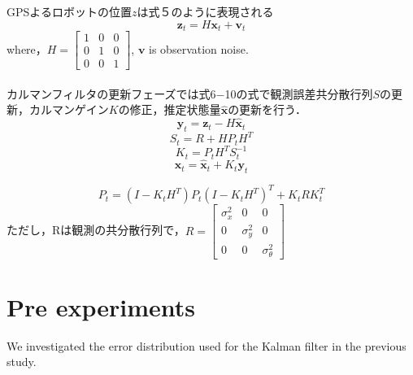 \documentclass[a4paper]{article}
\begin{document}
%
%
GPSよるロボットの位置$z$は式５のように表現される
\begin{equation}
    \bm{z}_{t} = H\bm{x}_{t} + \bm{v}_{t}
    \label{eq:5}
\end{equation}
where，$H = \begin{bmatrix} 1 & 0 & 0 \\  0 & 1 & 0 \\  0 & 0 & 1 \end{bmatrix}$, 
$\bm{v}$ is observation noise. \\ \\
カルマンフィルタの更新フェーズでは式6−10の式で観測誤差共分散行列$S$の更新，カルマンゲイン$K$の修正，推定状態量$\bm{\hat{x}}$の更新を行う．
\begin{equation}
    \bm{y}_{t} = \bm{z}_{t} - H\bm{\hat{x}}_{t}
    \label{eq:6}
\end{equation}
%
%
\begin{equation}
    S_{t} = R + HP_{t}H^{T}
    \label{eq:7}
\end{equation}
%
%
\begin{equation}
K_{t} = P_{t}H^{T}S_{t}^{-1}
    \label{eq:8}
\end{equation}
\begin{equation}
    \bm{\hat{x}}_{t} = \bm{\hat{x}}_{t}+K_{t}\bm{y}_{t}
    \label{eq:8}
\end{equation}

\begin{equation}
    P_{t} = (I-K_{t}H^{T})P_{t}(I-K_{t}H^{T})^{T} + K_{t}RK_{t}^{T}
    \label{eq:9}
\end{equation}
%
ただし，Rは観測の共分散行列で，$R = \begin{bmatrix} \sigma_{x}^{2} & 0 & 0 \\  0 & \sigma_{y}^{2} & 0 \\  0 & 0 & \sigma_{\theta}^{2} \end{bmatrix}$\\



\section{Pre experiments}
We investigated the error distribution used for the Kalman filter in the previous study.
\end{document}
